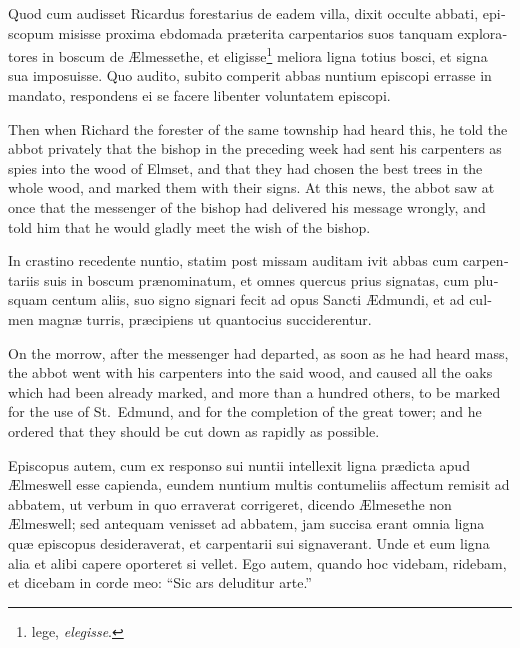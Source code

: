 \documentclass[10pt]{book}
\begin{document}
\begin{paracol}{2}
\switchcolumn*

\begin{otherlanguage}{latin}
Quod cum audisset Ricardus forestarius de eadem villa, dixit occulte abbati, episcopum misisse proxima ebdomada pr\ae{}terita carpentarios suos tanquam exploratores in boscum de \AE{}lmessethe, et eligisse\footnote[\textdagger]{lege, \emph{elegisse}.} meliora ligna totius bosci, et signa sua imposuisse. Quo audito, subito comperit abbas nuntium episcopi errasse in mandato, respondens ei se facere libenter voluntatem episcopi. 
\end{otherlanguage}

\switchcolumn

Then when Richard the forester of the same township had heard this, he told the abbot privately that the bishop in the preceding week had sent his carpenters as spies into the wood of Elmset, and that they had chosen the best trees in the whole wood, and marked them with their signs. At this news, the abbot saw at once that the messenger of the bishop had delivered his message wrongly, and told him that he would gladly meet the wish of the bishop.

\switchcolumn*

\begin{otherlanguage}{latin}
In crastino recedente nuntio, statim post missam auditam ivit abbas cum carpentariis suis in boscum pr\ae{}nominatum, et omnes quercus prius signatas, cum plusquam centum aliis, suo signo signari fecit ad opus Sancti \AE{}dmundi, et ad culmen magn\ae{} turris, pr\ae{}cipiens ut quantocius succiderentur.
\end{otherlanguage}

\switchcolumn

On the morrow, after the messenger had departed, as soon as he had heard mass, the abbot went with his carpenters into the said wood, and caused all the oaks which had been already marked, and more than a hundred others, to be marked for the use of St.\ Edmund, and for the completion of the great tower; and he ordered that they should be cut down as rapidly as possible.

\switchcolumn*

\begin{otherlanguage}{latin}
Episcopus autem, cum ex responso sui nuntii intellexit ligna pr\ae{}dicta apud \AE{}lmeswell esse capienda, eundem nuntium multis contumeliis affectum remisit ad abbatem, ut verbum in quo erraverat corrigeret, dicendo \AE{}lmesethe non \AE{}lmeswell; sed antequam venisset ad abbatem, jam succisa erant omnia ligna qu\ae{} episcopus desideraverat, et carpentarii sui signaverant. Unde et eum ligna alia et alibi capere oporteret si vellet. Ego autem, quando hoc videbam, ridebam, et dicebam in corde meo: ``Sic ars deluditur arte.''
\end{otherlanguage}


\end{paracol}
\end{document}
